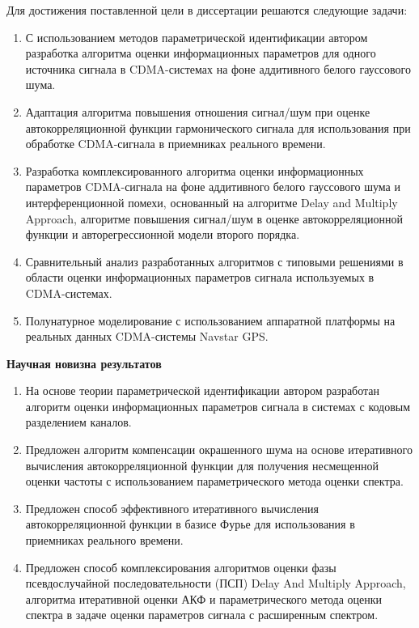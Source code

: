 Для достижения поставленной цели в диссертации решаются следующие задачи:
\begin{enumerate}
	\item {С использованием методов параметрической идентификации автором разработка алгоритма оценки информационных параметров для одного источника сигнала
		в CDMA-системах на фоне аддитивного белого гауссового шума.}
	\item {Адаптация алгоритма повышения отношения сигнал/шум при оценке автокорреляционной функции гармонического сигнала для использования при обработке
		CDMA-сигнала в приемниках реального времени.}
	\item {Разработка комплексированного алгоритма оценки информационных параметров CDMA-сигнала на фоне аддитивного белого гауссового шума и
		интерференционной помехи, основанный на алгоритме Delay and Multiply Approach, алгоритме повышения сигнал/шум в оценке автокорреляционной функции 
		и авторегрессионной модели второго порядка.}
	\item {Сравнительный анализ разработанных алгоритмов с типовыми решениями в области оценки информационных параметров сигнала используемых в CDMA-системах.}
	\item {Полунатурное моделирование с использованием аппаратной платформы на реальных данных CDMA-системы Navstar GPS.}
\end{enumerate}

{\bf{Научная новизна результатов}}

\begin{enumerate}
	\item{На основе теории параметрической идентификации автором разработан алгоритм оценки информационных параметров сигнала в системах с кодовым разделением каналов.}
	\item{Предложен алгоритм компенсации окрашенного шума на основе итеративного вычисления автокорреляционной функции для
		получения несмещенной оценки частоты с использованием параметрического метода оценки спектра.}
	\item{Предложен способ эффективного итеративного вычисления автокорреляционной функции в базисе Фурье для использования в
		приемниках реального времени.}
	\item{Предложен способ комплексирования алгоритмов оценки фазы псевдослучайной последовательности (ПСП) Delay And Multiply Approach, алгоритма итеративной оценки АКФ и
		параметрического метода оценки спектра в задаче оценки параметров сигнала с расширенным спектром.}
\end{enumerate}

